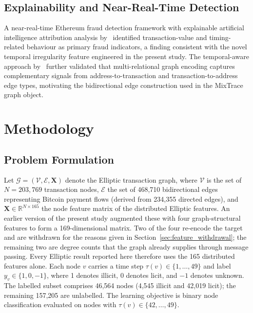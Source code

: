 \documentclass[12pt,a4paper]{article}
\begin{document}
\subsection{Explainability and Near-Real-Time Detection}

A near-real-time Ethereum fraud detection framework with
explainable artificial intelligence attribution analysis
by~\citep{ethereum2025xai} identified transaction-value and
timing-related behaviour as primary fraud indicators,
a finding consistent with the novel temporal irregularity
feature engineered in the present study.
The temporal-aware approach by~\citep{wei2025} further
validated that multi-relational graph encoding captures
complementary signals from address-to-transaction and
transaction-to-address edge types, motivating the
bidirectional edge construction used in the MixTrace graph
object.

\section{Methodology}
\label{sec:method}

\subsection{Problem Formulation}
\label{sec:problem}

Let $\mathcal{G} = (\mathcal{V}, \mathcal{E}, \mathbf{X})$
denote the Elliptic transaction graph, where $\mathcal{V}$
is the set of $N = 203{,}769$ transaction nodes,
$\mathcal{E}$ the set of 468,710 bidirectional edges
representing Bitcoin payment flows (derived from 234,355
directed edges), and $\mathbf{X} \in \mathbb{R}^{N \times 165}$
the node feature matrix of the distributed Elliptic features. An
earlier version of the present study augmented these with four
graph-structural features to form a 169-dimensional matrix. Two
of the four re-encode the target and are withdrawn for the
reasons given in Section~\ref{sec:feature_withdrawal}; the
remaining two are degree counts that the graph already supplies
through message passing. Every Elliptic result reported here
therefore uses the 165 distributed features alone.
Each node $v$ carries a time step $\tau(v) \in \{1,\ldots,49\}$
and label $y_v \in \{1, 0, -1\}$, where 1 denotes illicit,
0 denotes licit, and $-1$ denotes unknown.
The labelled subset comprises 46,564 nodes (4,545 illicit
and 42,019 licit); the remaining 157,205 are unlabelled.
The learning objective is binary node classification
evaluated on nodes with $\tau(v) \in \{42,\ldots,49\}$.
\end{document}
